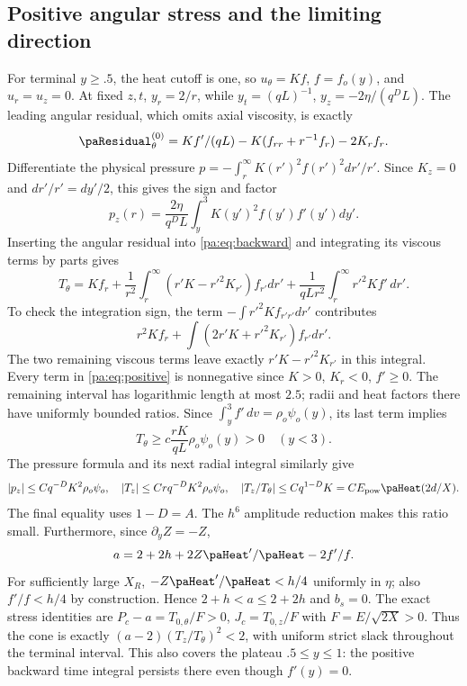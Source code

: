 \documentclass[10pt,a4paper]{article}
\begin{document}
\subsection{Positive angular stress and the limiting direction}
For terminal $y\ge.5$, the heat cutoff is one, so $u_\theta=Kf$, $f=f_o(y)$,
and $u_r=u_z=0$. At fixed $z,t$, $y_r=2/r$, while
$y_t=(qL)^{-1}$, $y_z=-2\eta/(q^DL)$. The leading angular residual,
which omits axial viscosity, is exactly
\[
\paResidual_\theta^{(0)}=Kf'/(qL)-K(f_{rr}+r^{-1}f_r)-2K_rf_r.
\]
Differentiate the physical pressure $p=-\int_r^\infty K(r')^2f(r')^2dr'/r'$.
Since $K_z=0$ and $dr'/r'=dy'/2$, this gives the sign and factor
\[
p_z(r)=\frac{2\eta}{q^DL}\int_y^3K(y')^2f(y')f'(y')dy'.
\]
Inserting the angular residual into \eqref{pa:eq:backward} and integrating its
viscous terms by parts gives
\begin{equation}\label{pa:eq:positive}\tag{PA.POS}
T_\theta=Kf_r+\frac1{r^2}\int_r^\infty(r'K-r'^2K_{r'})f_{r'}dr'
+\frac1{qLr^2}\int_r^\infty r'^2Kf'\,dr'.
\end{equation}
To check the integration sign, the term $-\int r'^2Kf_{r'r'}dr'$ contributes
\[
r^2Kf_r+\int(2r'K+r'^2K_{r'})f_{r'}dr'.
\]
The two remaining
viscous terms leave exactly $r'K-r'^2K_{r'}$ in this integral.
Every term in \eqref{pa:eq:positive} is nonnegative since $K>0$, $K_r<0$,
$f'\ge0$. The remaining interval has logarithmic length at most $2.5$;
radii and heat factors there have uniformly bounded ratios. Since
$\int_y^3f'\,dv=\rho_o\psi_o(y)$, its last term implies
\[
T_\theta\ge c\frac{rK}{qL}\rho_o\psi_o(y)>0\quad(y<3).
\]
The pressure formula and its next radial integral similarly give
\[
|p_z|\le Cq^{-D}K^2\rho_o\psi_o,
\quad |T_z|\le Crq^{-D}K^2\rho_o\psi_o,
\quad |T_z/T_\theta|\le Cq^{1-D}K=C E_{\rm pow}\paHeat(2d/X).
\]
The final equality uses $1-D=A$. The $h^6$ amplitude reduction makes this
ratio small. Furthermore, since $\partial_yZ=-Z$,
\[
a=2+2h+2Z\paHeat'/\paHeat-2f'/f.
\]
For sufficiently large $X_R$, $-Z\paHeat'/\paHeat<h/4$ uniformly in $\eta$;
also $f'/f<h/4$ by construction. Hence $2+h<a\le2+2h$ and $b_s=0$.
The exact stress identities are
$P_c-a=T_{0,\theta}/F>0$, $J_c=T_{0,z}/F$ with $F=E/\sqrt{2X}>0$.
Thus the cone is exactly $(a-2)(T_z/T_\theta)^2<2$, with uniform strict
slack throughout the terminal interval. This also covers the plateau $.5\le y\le1$:
the positive backward time integral persists there even though $f'(y)=0$.
\end{document}
